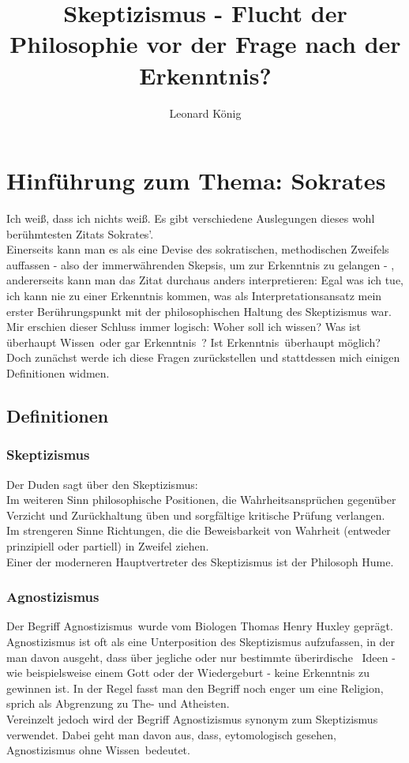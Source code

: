 \documentclass[11pt,a4paper]{article}
\author{Leonard König}
\title{Skeptizismus - Flucht der Philosophie vor der Frage nach der Erkenntnis?}
\begin{document}
\maketitle
\tableofcontents
\newpage
\section{Hinführung zum Thema: Sokrates}
\glqq Ich weiß, dass ich nichts weiß\grqq. Es gibt verschiedene Auslegungen dieses wohl berühmtesten Zitats Sokrates'.%
\\Einerseits kann man es als eine Devise des sokratischen, methodischen Zweifels auffassen - also der immerwährenden Skepsis, um zur Erkenntnis zu gelangen - , andererseits kann man das Zitat durchaus anders interpretieren: Egal was ich tue, ich kann nie zu einer Erkenntnis kommen, was als Interpretationsansatz mein erster Berührungspunkt mit der philosophischen Haltung des Skeptizismus war.\\
Mir erschien dieser Schluss immer logisch: Woher soll ich \glqq wissen\grqq? Was ist überhaupt \glqq Wissen\grqq\ oder gar \glqq Erkenntnis\grqq\ ? Ist \glqq Erkenntnis\grqq\ überhaupt möglich?\\
Doch zunächst werde ich diese Fragen zurückstellen und stattdessen mich einigen Definitionen widmen.
	\subsection{Definitionen}
		\subsubsection{Skeptizismus}
Der Duden sagt über den Skeptizismus:\\
\glqq Im weiteren Sinn philosophische Positionen, die Wahrheitsansprüchen gegenüber Verzicht und Zurückhaltung üben und sorgfältige kritische Prüfung verlangen.\\
Im strengeren Sinne Richtungen, die die Beweisbarkeit von Wahrheit (entweder prinzipiell oder partiell) in Zweifel ziehen.\grqq%
\\Einer der moderneren Hauptvertreter des Skeptizismus ist
der Philosoph Hume.\\%
		\subsubsection{Agnostizismus}
Der Begriff \glqq Agnostizismus\grqq\ wurde vom Biologen Thomas Henry Huxley geprägt. Agnostizismus ist oft als eine Unterposition des Skeptizismus aufzufassen, in der man davon ausgeht, dass über jegliche oder nur bestimmte überirdische%
\ Ideen - wie beispielsweise einem Gott oder der Wiedergeburt - keine Erkenntnis zu gewinnen ist. In der Regel fasst man den Begriff noch enger um eine Religion, sprich als Abgrenzung zu The- und Atheisten.\\ 
Vereinzelt jedoch wird der Begriff Agnostizismus synonym zum Skeptizismus verwendet. Dabei geht man davon aus, dass, eytomologisch gesehen, Agnostizismus \glqq ohne Wissen\grqq\ bedeutet.
\end{document}
